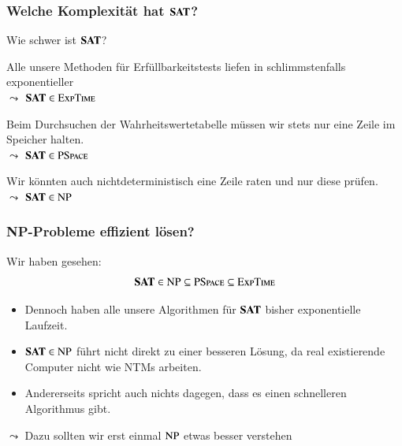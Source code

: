 \documentclass[aspectratio=1610,onlymath]{beamer}
\begin{document}
\maketitle


\begin{frame}\frametitle{Welche Komplexität hat $\textbf{\textcolor{black}{SAT}}$?}

Wie schwer ist $\textbf{\textcolor{black}{SAT}}$?\pause
\bigskip

\alert{Alle unsere Methoden für Erfüllbarkeitstests liefen in schlimmstenfalls exponentieller }\\ \pause
$\leadsto$ $\textbf{\textcolor{black}{SAT}}\in{\textsc{ExpTime}}$
\bigskip

\alert{Beim Durchsuchen der Wahrheitswertetabelle müssen wir stets nur eine Zeile im Speicher halten.}\\ \pause
$\leadsto$ $\textbf{\textcolor{black}{SAT}}\in{\textsc{PSpace}}$
\bigskip\pause

\alert{Wir könnten auch nichtdeterministisch eine Zeile raten und nur diese prüfen.}\\\pause
$\leadsto$ $\textbf{\textcolor{black}{SAT}}\in{\textsc{NP}}$
\bigskip

\end{frame}


\begin{frame}\frametitle{NP-Probleme effizient lösen?}

Wir haben gesehen:
\[ \textbf{\textcolor{black}{SAT}}\in{\textsc{NP}}\subseteq{\textsc{PSpace}}\subseteq{\textsc{ExpTime}}\]

\begin{itemize}
\item Dennoch haben alle unsere Algorithmen für $\textbf{\textcolor{black}{SAT}}$ bisher 
exponentielle Laufzeit.
\item $\textbf{\textcolor{black}{SAT}}\in{\textsc{NP}}$ führt nicht direkt zu einer besseren Lösung, da real existierende Computer nicht wie NTMs arbeiten.
\item Andererseits spricht auch nichts dagegen, dass es einen schnelleren Algorithmus gibt.
\end{itemize}

$\leadsto$ Dazu sollten wir erst einmal ${\textsc{NP}}$ etwas besser verstehen

\end{frame}
\end{document}
